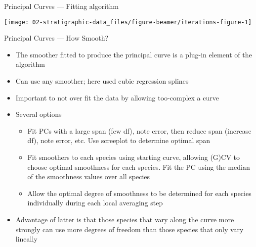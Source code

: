 \documentclass[10pt,ignorenonframetext,compress, aspectratio=169]{beamer}
\providecommand{\tightlist}{%
  \setlength{\itemsep}{0pt}\setlength{\parskip}{0pt}}
\begin{document}
\begin{frame}{Principal Curves --- Fitting algorithm}

\begin{center}\texttt{[image: 02-stratigraphic-data\_files/figure-beamer/iterations-figure-1]} \end{center}

\end{frame}

\begin{frame}{Principal Curves --- How Smooth?}

\begin{itemize}
\tightlist
\item
  The smoother fitted to produce the principal curve is a plug-in
  element of the algorithm
\item
  Can use any smoother; here used cubic regression splines
\item
  Important to not over fit the data by allowing too-complex a curve
\item
  Several options

  \begin{itemize}
  \tightlist
  \item
    Fit PCs with a large span (few df), note error, then reduce span
    (increase df), note error, etc. Use screeplot to determine optimal
    span
  \item
    Fit smoothers to each species using starting curve, allowing (G)CV
    to choose optimal smoothness for each species. Fit the PC using the
    median of the smoothness values over all species
  \item
    Allow the optimal degree of smoothness to be determined for each
    species individually during each local averaging step
  \end{itemize}
\item
  Advantage of latter is that those species that vary along the curve
  more strongly can use more degrees of freedom than those species that
  only vary lineally
\end{itemize}

\end{frame}
\end{document}
